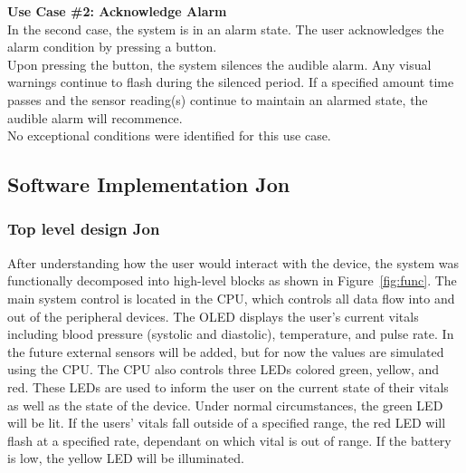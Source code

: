 \documentclass[12pt]{article} %
\begin{document}
\textbf{Use Case \#2: Acknowledge Alarm} \\
In the second case, the system is in an alarm state. The user acknowledges
the alarm condition by pressing a button. \\
Upon pressing the button, the system silences the audible alarm. Any visual warnings continue to flash during the silenced period. If a specified amount 
time passes and the sensor reading(s) continue to maintain an alarmed state,
the audible alarm will recommence.\\ 

No exceptional conditions were identified for this use case.\\


\subsection{Software Implementation  Jon}


\subsubsection{Top level design Jon}


After understanding how the user would interact with the device, the system was
functionally decomposed into high-level blocks as shown in
Figure~\ref{fig:func}.  The main system control is located in the CPU, which
controls all data flow into and out of the peripheral devices.  The OLED
displays the user's current vitals including blood pressure (systolic and
diastolic), temperature, and pulse rate.  In the future external sensors will
be added, but for now the values are simulated using the CPU.  The CPU also
controls three LEDs colored green, yellow, and red.  These LEDs are used to
inform the user on the current state of their vitals as well as the state of
the device.  Under normal circumstances, the green LED will be lit.  If the
users' vitals fall outside of a specified range, the red LED will flash at a
specified rate, dependant on which vital is out of range.  If the battery is
low, the yellow LED will be illuminated.
\end{document}

